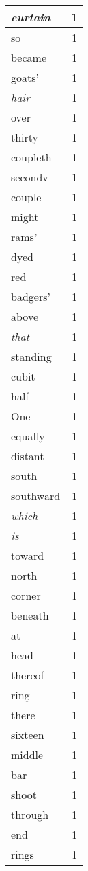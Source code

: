\begin{center}
\begin{longtable}{l|r}
\emph{curtain} & 1 \\ \hline
so & 1 \\ \hline
became & 1 \\ \hline
goats' & 1 \\ \hline
\emph{hair} & 1 \\ \hline
over & 1 \\ \hline
thirty & 1 \\ \hline
coupleth & 1 \\ \hline
secondv & 1 \\ \hline
couple & 1 \\ \hline
might & 1 \\ \hline
rams' & 1 \\ \hline
dyed & 1 \\ \hline
red & 1 \\ \hline
badgers' & 1 \\ \hline
above & 1 \\ \hline
\emph{that} & 1 \\ \hline
standing & 1 \\ \hline
cubit & 1 \\ \hline
half & 1 \\ \hline
One & 1 \\ \hline
equally & 1 \\ \hline
distant & 1 \\ \hline
south & 1 \\ \hline
southward & 1 \\ \hline
\emph{which} & 1 \\ \hline
\emph{is} & 1 \\ \hline
toward & 1 \\ \hline
north & 1 \\ \hline
corner & 1 \\ \hline
beneath & 1 \\ \hline
at & 1 \\ \hline
head & 1 \\ \hline
thereof & 1 \\ \hline
ring & 1 \\ \hline
there & 1 \\ \hline
sixteen & 1 \\ \hline
middle & 1 \\ \hline
bar & 1 \\ \hline
shoot & 1 \\ \hline
through & 1 \\ \hline
end & 1 \\ \hline
rings & 1 \\ \hline

\end{longtable}
\end{center}
